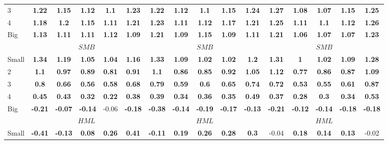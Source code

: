 \begin{table}[H]
\begin{tabular}{lccccc|ccccc|ccccc}
3 & \textbf{1.22} & \textbf{1.15} & \textbf{1.12} & \textbf{1.1} & \textbf{1.23} & \textbf{1.22} & \textbf{1.12} & \textbf{1.1} & \textbf{1.15} & \textbf{1.24} & \textbf{1.27} & \textbf{1.08} & \textbf{1.07} & \textbf{1.15} & \textbf{1.25} \\
4 & \textbf{1.18} & \textbf{1.2} & \textbf{1.15} & \textbf{1.11} & \textbf{1.21} & \textbf{1.23} & \textbf{1.11} & \textbf{1.12} & \textbf{1.17} & \textbf{1.21} & \textbf{1.25} & \textbf{1.11} & \textbf{1.1} & \textbf{1.12} & \textbf{1.26} \\
Big & \textbf{1.13} & \textbf{1.11} & \textbf{1.11} & \textbf{1.12} & \textbf{1.09} & \textbf{1.21} & \textbf{1.09} & \textbf{1.15} & \textbf{1.09} & \textbf{1.11} & \textbf{1.21} & \textbf{1.06} & \textbf{1.07} & \textbf{1.07} & \textbf{1.23} \\
 & \multicolumn{5}{c|}{$SMB$} & \multicolumn{5}{c|}{$SMB$} & \multicolumn{5}{c}{$SMB$} \\
Small & \textbf{1.34} & \textbf{1.19} & \textbf{1.05} & \textbf{1.04} & \textbf{1.16} & \textbf{1.33} & \textbf{1.09} & \textbf{1.02} & \textbf{1.02} & \textbf{1.2} & \textbf{1.31} & \textbf{1} & \textbf{1.02} & \textbf{1.09} & \textbf{1.28} \\
2 & \textbf{1.1} & \textbf{0.97} & \textbf{0.89} & \textbf{0.81} & \textbf{0.91} & \textbf{1.1} & \textbf{0.86} & \textbf{0.85} & \textbf{0.92} & \textbf{1.05} & \textbf{1.12} & \textbf{0.77} & \textbf{0.86} & \textbf{0.87} & \textbf{1.09} \\
3 & \textbf{0.8} & \textbf{0.66} & \textbf{0.56} & \textbf{0.58} & \textbf{0.68} & \textbf{0.79} & \textbf{0.59} & \textbf{0.6} & \textbf{0.65} & \textbf{0.74} & \textbf{0.72} & \textbf{0.53} & \textbf{0.55} & \textbf{0.61} & \textbf{0.87} \\
4 & \textbf{0.45} & \textbf{0.43} & \textbf{0.32} & \textbf{0.22} & \textbf{0.38} & \textbf{0.39} & \textbf{0.34} & \textbf{0.36} & \textbf{0.35} & \textbf{0.49} & \textbf{0.37} & \textbf{0.28} & \textbf{0.3} & \textbf{0.34} & \textbf{0.53} \\
Big & \textbf{-0.21} & \textbf{-0.07} & \textbf{-0.14} & -0.06 & \textbf{-0.18} & \textbf{-0.38} & \textbf{-0.14} & \textbf{-0.19} & \textbf{-0.17} & \textbf{-0.13} & \textbf{-0.21} & \textbf{-0.12} & \textbf{-0.14} & \textbf{-0.18} & \textbf{-0.18} \\
 & \multicolumn{5}{c|}{$HML$} & \multicolumn{5}{c|}{$HML$} & \multicolumn{5}{c}{$HML$} \\
Small & \textbf{-0.41} & \textbf{-0.13} & \textbf{0.08} & \textbf{0.26} & \textbf{0.41} & \textbf{-0.11} & \textbf{0.19} & \textbf{0.26} & \textbf{0.28} & \textbf{0.3} & -0.04 & \textbf{0.18} & \textbf{0.14} & \textbf{0.13} & -0.02 \\

\end{tabular}
\end{table}
